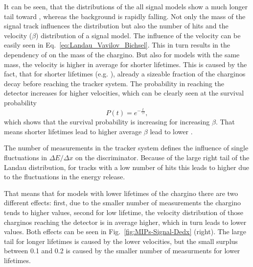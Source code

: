 It can be seen, that the \ias distributions of the all signal models show a much longer tail toward , whereas the background is rapidly falling.
Not only the mass of the signal track influences the \ias distribution but also the number of hits and the velocity ($\beta$) distribution of a signal model.
The influence of the velocity can be easily seen in Eq.~\ref{eq:Landau_Vavilov_Bichsel}. 
This in turn results in the dependency of \ias on the mass of the chargino.
But also for models with the same mass, the velocity is higher in average for shorter lifetimes.
This is caused by the fact, that for shorter lifetimes (e.g. \cm), already a sizeable fraction of the charginos decay before reaching the tracker system.
The probability in reaching the detector increases for higher velocities, which can be clearly seen at the survival probability
\begin{equation}
P \left( t \right) = e^{-\frac{t}{\gamma \tau}},
\end{equation} 
which shows that the survival probability is increasing for increasing $\beta$. 
That means shorter lifetimes lead to higher average $\beta$ lead to lower \ias.

The number of measurements in the tracker system defines the influence of single fluctuations in $\Delta E/\Delta x$ on the \ias discriminator. 
Because of the large right tail of the Landau distribution, for tracks with a low number of hits this leads to higher \ias due to the  fluctuations in the energy release.

That means that for models with lower lifetimes of the chargino there are two different effects: 
first, due to the smaller number of measurements the chargino tends to higher \ias values, 
second for low lifetime, the velocity distribution of those charginos reaching the detector is in average higher, which in turn leads to lower  \ias values.
Both effects can be seen in Fig.~\ref{fig:MIPs-Signal-Dedx} (right).
The large tail for longer lifetimes is caused by the lower velocities, but the small surplus between 0.1 and 0.2 is caused by the smaller number of measurments for lower lifetimes.\\

